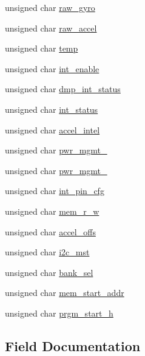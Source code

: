 \begin{DoxyCompactItemize}
unsigned char \hyperlink{structgyro__reg__s_a1366c90aec04a4e1d212de76d3f0b6cc}{raw\+\_\+gyro}
\item 
unsigned char \hyperlink{structgyro__reg__s_a3a78e67f9066b6b8601f375fcaadf005}{raw\+\_\+accel}
\item 
unsigned char \hyperlink{structgyro__reg__s_abe413cb96d839cbe31417aa52d920f21}{temp}
\item 
unsigned char \hyperlink{structgyro__reg__s_ab0cc290f4f43cd8a8b6562a97f540493}{int\+\_\+enable}
\item 
unsigned char \hyperlink{structgyro__reg__s_a5362f39039c1bbcc9aaa5a973eb762da}{dmp\+\_\+int\+\_\+status}
\item 
unsigned char \hyperlink{structgyro__reg__s_a39621694d9d5d0c0488c66fa8d088562}{int\+\_\+status}
\item 
unsigned char \hyperlink{structgyro__reg__s_a9c4b97b2bf0f2fcee9538e74fcaf5c3f}{accel\+\_\+intel}
\item 
unsigned char \hyperlink{structgyro__reg__s_ad746a196c317f0f4d557a92b9eb98d34}{pwr\+\_\+mgmt\+\_}
\item 
unsigned char \hyperlink{structgyro__reg__s_adc9ae0e35f199b3349174ac09e219ecb}{pwr\+\_\+mgmt\+\_}
\item 
unsigned char \hyperlink{structgyro__reg__s_a135c6ee7cb6bdbf6ef9471ce5a6e1724}{int\+\_\+pin\+\_\+cfg}
\item 
unsigned char \hyperlink{structgyro__reg__s_a1e6aa9b45ef18f1e5f6369c6383e1f0f}{mem\+\_\+r\+\_\+w}
\item 
unsigned char \hyperlink{structgyro__reg__s_a29bdc7a4514a6d9714e6f95958272a21}{accel\+\_\+offs}
\item 
unsigned char \hyperlink{structgyro__reg__s_af48ab798d6b786068dfbba8bb176bf1e}{i2c\+\_\+mst}
\item 
unsigned char \hyperlink{structgyro__reg__s_ac5fa957c7e1347ce8cf61f4a5fc52a5c}{bank\+\_\+sel}
\item 
unsigned char \hyperlink{structgyro__reg__s_ae2cfd68006c94f82add6eab04990c73b}{mem\+\_\+start\+\_\+addr}
\item 
unsigned char \hyperlink{structgyro__reg__s_a0813e85e389743e828cc84c5b903ada1}{prgm\+\_\+start\+\_\+h}
\end{DoxyCompactItemize}


\subsection{Field Documentation}
